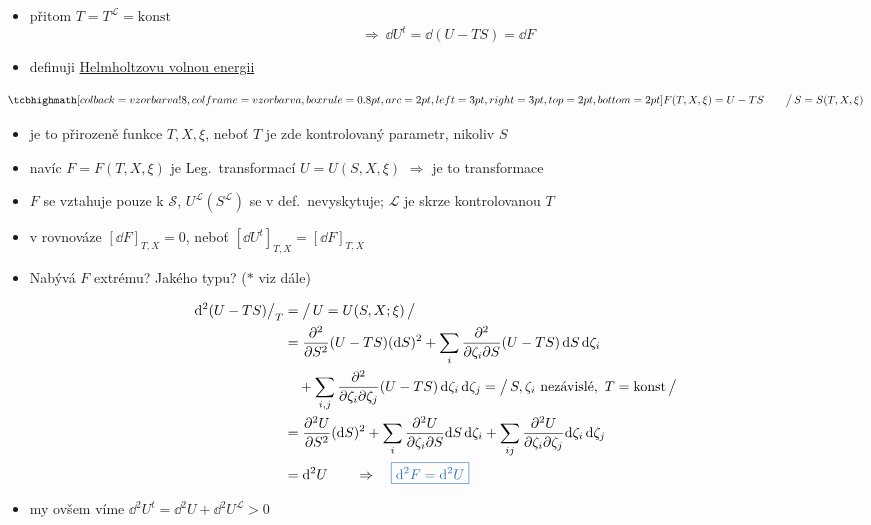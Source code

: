 \begin{itemize}
  \item přitom $T = T^{\mathcal{L}} = \text{konst}$
  \[ \Rightarrow\ \boxed{\dd U^t = \dd(U - TS) = \dd F} \]
  \item definuji \underline{Helmholtzovu volnou energii}
\end{itemize}
\begin{definice}
\[
  \vzorec{F(T,X,\xi) = U - TS} \qquad \big/\,S = S(T,X,\xi)
\]
\end{definice}
\begin{itemize}[nosep]
  \item[$\to$] je to přirozeně funkce $T,X,\xi$, neboť $T$ je zde kontrolovaný parametr, nikoliv $S$
  \item[$\to$] navíc $F = F(T,X,\xi)$ je Leg.\ transformací $U = U(S,X,\xi)$ $\Rightarrow$ je to  transformace
  \item[$\to$] $F$ se vztahuje pouze k $\mathcal{S}$, $U^{\mathcal{L}}(S^{\mathcal{L}})$ se v def.\ nevyskytuje; $\mathcal{L}$ je  skrze kontrolovanou $T$
  \item[$\to$] v rovnováze $[\dd F]_{T,X} = 0$, neboť $[\dd U^t]_{T,X} = [\dd F]_{T,X}$
\end{itemize}
\begin{itemize}
  \item Nabývá $F$ extrému? Jakého typu? \hfill \textcolor{NavyBlue}{($\ast$ viz dále)}
\end{itemize}
\begin{align*}
  \dd^2(U - TS)\big/_T &= \big/\,U = U(S,X;\xi)\,\big/ \\
  &= \frac{\partial^2}{\partial S^2}(U - TS)(\dd S)^2 + \sum_i\frac{\partial^2}{\partial\zeta_i\partial S}(U - TS)\,\dd S\,\dd\zeta_i \\
  &\quad + \sum_{i,j}\frac{\partial^2}{\partial\zeta_i\partial\zeta_j}(U - TS)\,\dd\zeta_i\,\dd\zeta_j
   = \big/\,S, \zeta_i \text{ nezávislé},\ T = \text{konst}\,\big/ \\
  &= \frac{\partial^2U}{\partial S^2}(\dd S)^2 + \sum_i\frac{\partial^2U}{\partial\zeta_i\partial S}\dd S\,\dd\zeta_i + \sum_{ij}\frac{\partial^2U}{\partial\zeta_i\partial\zeta_j}\dd\zeta_i\,\dd\zeta_j \\
  &= \dd^2U \qquad\Rightarrow\quad \textcolor{NavyBlue}{\boxed{\dd^2F = \dd^2U}}
\end{align*}
\begin{itemize}
  \item my ovšem víme $\dd^2U^t = \dd^2U + \dd^2U^{\mathcal{L}} > 0$
\end{itemize}


